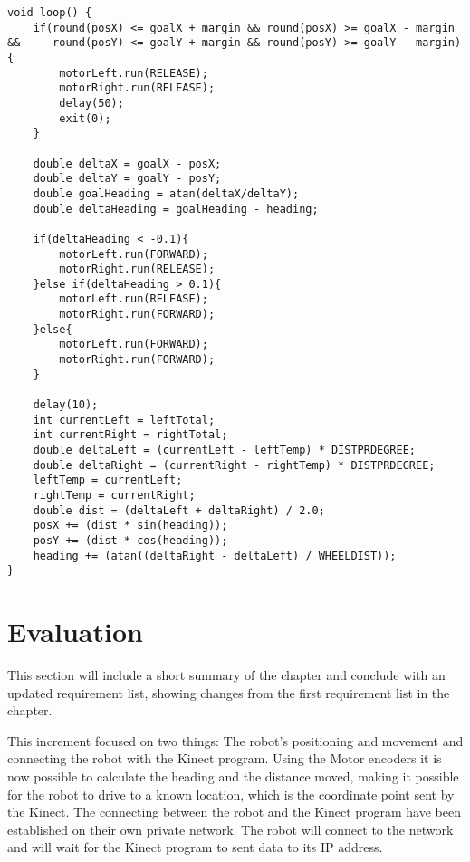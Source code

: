 \begin{lstlisting}[caption={The loop function}, label={loop}]
void loop() {
	if(round(posX) <= goalX + margin && round(posX) >= goalX - margin &&     round(posY) <= goalY + margin && round(posY) >= goalY - margin){
		motorLeft.run(RELEASE);
		motorRight.run(RELEASE);
		delay(50);
		exit(0);
	}

	double deltaX = goalX - posX;
	double deltaY = goalY - posY;
	double goalHeading = atan(deltaX/deltaY);
	double deltaHeading = goalHeading - heading;

	if(deltaHeading < -0.1){
		motorLeft.run(FORWARD);
		motorRight.run(RELEASE);
	}else if(deltaHeading > 0.1){
		motorLeft.run(RELEASE);
		motorRight.run(FORWARD);
	}else{
		motorLeft.run(FORWARD);
		motorRight.run(FORWARD);
	}

	delay(10);
	int currentLeft = leftTotal;
	int currentRight = rightTotal;
	double deltaLeft = (currentLeft - leftTemp) * DISTPRDEGREE;
	double deltaRight = (currentRight - rightTemp) * DISTPRDEGREE;
	leftTemp = currentLeft;
	rightTemp = currentRight;
	double dist = (deltaLeft + deltaRight) / 2.0;
	posX += (dist * sin(heading));
	posY += (dist * cos(heading));
	heading += (atan((deltaRight - deltaLeft) / WHEELDIST));
}
\end{lstlisting}



\section{Evaluation}
\label{sec:i2Evaluation}
This section will include a short summary of the chapter and conclude with an updated requirement list, showing changes from the first requirement list in the chapter.

This increment focused on two things: The robot's positioning and movement and connecting the robot with the Kinect program. \newline
Using the Motor encoders it is now possible to calculate the heading and the distance moved, making it possible for the robot to drive to a known location, which is the coordinate point sent by the Kinect. \newline
The connecting between the robot and the Kinect program have been established on their own private network. The robot will connect to the network and will wait for the Kinect program to sent data to its IP address.  

